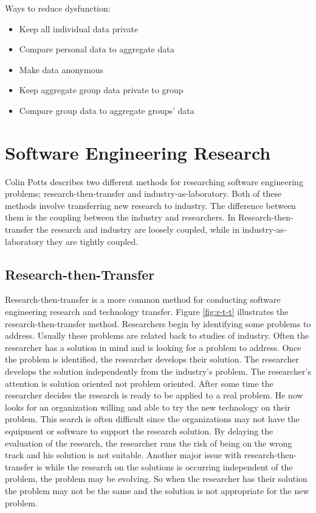 Ways to reduce dysfunction:
\begin{itemize}
\item{Keep all individual data private}
\item{Compare personal data to aggregate data}
\item{Make data anonymous}
\item{Keep aggregate group data private to group}
\item{Compare group data to aggregate groups' data}
\end{itemize}


\section{Software Engineering Research}

Colin Potts describes two different methods for researching software
engineering problems; research-then-transfer and
industry-as-laboratory\cite{Potts93}.  Both of these methods involve
transferring new research to industry.  The difference between them is the
coupling between the industry and researchers.  In Research-then-transfer
the research and industry are loosely coupled, while in
industry-as-laboratory they are tightly coupled.

\subsection{Research-then-Transfer}

Research-then-transfer is a more common method for conducting software
engineering research and technology transfer. Figure \ref{fig:r-t-t}
illustrates the research-then-transfer method.  Researchers begin by
identifying some problems to address.  Usually these problems are related
back to studies of industry.  Often the researcher has a solution in mind
and is looking for a problem to address.  Once the problem is identified,
the researcher develops their solution.  The researcher develops the
solution independently from the industry's problem.  The researcher's
attention is solution oriented not problem oriented.  After some time the
researcher decides the research is ready to be applied to a real problem.
He now looks for an organization willing and able to try the new technology
on their problem.  This search is often difficult since the organizations
may not have the equipment or software to support the research solution.
By delaying the evaluation of the research, the researcher runs the risk of
being on the wrong track and his solution is not suitable.  Another major
issue with research-then-transfer is while the research on the solutions is
occurring independent of the problem, the problem may be evolving.  So when
the researcher has their solution the problem may not be the same and the
solution is not appropriate for the new problem.




